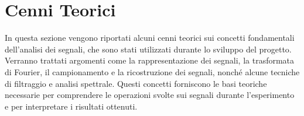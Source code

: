 \section{Cenni Teorici}
\label{sec:Teoria}
\thispagestyle{plain}
In questa sezione vengono riportati alcuni cenni teorici sui concetti fondamentali dell'analisi dei segnali, che sono stati utilizzati durante lo sviluppo del progetto. Verranno trattati argomenti come la rappresentazione dei segnali, la trasformata di Fourier, il campionamento e la ricostruzione dei segnali, nonché alcune tecniche di filtraggio e analisi spettrale. Questi concetti forniscono le basi teoriche necessarie per comprendere le operazioni svolte sui segnali durante l'esperimento e per interpretare i risultati ottenuti.


\newpage